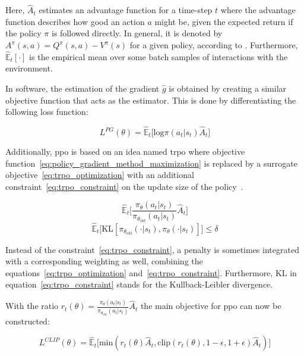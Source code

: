 \documentclass[draft,final]{vutinfth} %
\begin{document}
    Here, $\hat{A}_t$ estimates an advantage function for a time-step $t$ where the advantage function describes
    how good an action $a$ might be, given the expected return if the policy $\pi$ is followed directly.
    In general, it is denoted by $A^\pi(s,a)=Q^\pi(s,a)-V^\pi(s)$ for a given policy, according to \citeauthor{francois-lavet_introduction_2018}.
    Furthermore, $\hat{\mathbb{E}}_t[\cdot]$ is the empirical mean over some batch samples of interactions with the environment.

    In software, the estimation of the gradient $\hat{g}$ is obtained by creating a similar objective function that acts as the estimator.
    This is done by differentiating the following loss function:

    \begin{equation}
        L^{PG}(\theta)=\hat{\mathbb{E}}_t\bigg [\text{log}\pi(a_t|s_t)\hat{A}_t\bigg]\label{eq:no_clip_no_penalty}
    \end{equation}

    Additionally, \gls{ppo} is based on an idea named \gls{trpo} where objective function~\ref{eq:policy_gradient_method_maximization} is replaced by a surrogate objective~\eqref{eq:trpo_optimization} with an additional constraint~\eqref{eq:trpo_constraint} on the update size of the policy~\citep{schulman_trust_2015}.

    \begin{equation}
        \hat{\mathbb{E}}_t\bigg [\frac{\pi_\theta(a_t|s_t)}{\pi_{\theta_{\text{old}}}(a_t|s_t)}\hat{A}_t\bigg]\label{eq:trpo_optimization}
    \end{equation}
    \begin{equation}
        \hat{\mathbb{E}}_t\bigg [\text{KL}[\pi_{\theta_{\text{old}}}(\cdot|s_t),\pi_{\theta}(\cdot|s_t)]\bigg]\leq\delta\label{eq:trpo_constraint}
    \end{equation}

    Instead of the constraint~\ref{eq:trpo_constraint}, a penalty is sometimes integrated with a corresponding weighting as well, combining the equations~\ref{eq:trpo_optimization} and~\ref{eq:trpo_constraint}.
    Furthermore, KL in equation~\ref{eq:trpo_constraint} stands for the Kullback-Leibler divergence.

    With the ratio $r_t(\theta)=\frac{\pi_\theta(a_t|s_t)}{\pi_{\theta_{\text{old}}}(a_t|s_t)}\hat{A}_t$ the main objective for \gls{ppo} can now be constructed:

    \begin{equation}
        L^{CLIP}(\theta)=\hat{\mathbb{E}}_t\bigg[\text{min}(r_t(\theta)\hat{A}_t,\text{clip}(r_t(\theta),1-\epsilon,1+\epsilon)\hat{A}_t)\bigg]\label{eq:ppo_clip}
    \end{equation}
\end{document}
